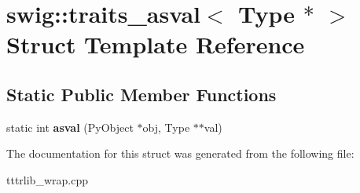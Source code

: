 \hypertarget{structswig_1_1traits__asval_3_01_type_01_5_01_4}{}\section{swig\+:\+:traits\+\_\+asval$<$ Type $\ast$ $>$ Struct Template Reference}
\label{structswig_1_1traits__asval_3_01_type_01_5_01_4}
\subsection*{Static Public Member Functions}
\begin{DoxyCompactItemize}
\item 
\mbox{\label{structswig_1_1traits__asval_3_01_type_01_5_01_4_a32b6c9822265d2822408db76cbae92c4}} 
static int {\bfseries asval} (Py\+Object $\ast$obj, Type $\ast$$\ast$val)
\end{DoxyCompactItemize}


The documentation for this struct was generated from the following file\+:\begin{DoxyCompactItemize}
\item 
tttrlib\+\_\+wrap.\+cpp\end{DoxyCompactItemize}
